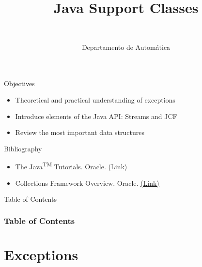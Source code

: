 \documentclass[10pt,compress]{beamer} %
\title[Java Support Classes]{Java Support Classes}
\author{\asignatura\\\carrera}
\institute{}
\date{Departamento de Automática}
\begin{document}
{\titlepageBlue
    \begin{frame}
        \titlepage
    \end{frame}
}

\institute{\asignatura}

\begin{frame}[plain]{}
   \begin{block}{Objectives}
      \begin{itemize}
	\item Theoretical and practical understanding of exceptions
	\item Introduce elements of the Java API: Streams and JCF
        \item Review the most important data structures
      \end{itemize} 
   \end{block}

   \begin{block}{Bibliography}
      \begin{itemize}
          \item The Java\textsuperscript{TM} Tutorials. Oracle. \href{https://docs.oracle.com/javase/tutorial/}{(Link)}
          \item Collections Framework Overview. Oracle. \href{http://docs.oracle.com/javase/7/docs/technotes/guides/collections/overview.html}{(Link)}
      \end{itemize} 
   \end{block}
\end{frame}

{
\begin{frame}[shrink]{Table of Contents}
 \frametitle{Table of Contents}
 \tableofcontents
\end{frame}
}

\section{Exceptions}
\end{document}
